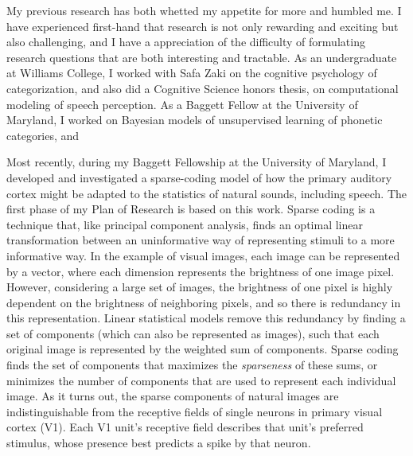 \documentclass[12pt]{article}
\begin{document}
My previous research has both whetted my appetite for more and humbled me.  I have experienced first-hand that research is not only rewarding and exciting but also challenging, and I have a appreciation of the difficulty of formulating research questions that are both interesting and tractable.  As an undergraduate at Williams College, I worked with Safa Zaki on the cognitive psychology of categorization, and also did a Cognitive Science honors thesis, on computational modeling of speech perception.  As a Baggett Fellow at the University of Maryland, I worked on Bayesian models of unsupervised learning of phonetic categories, and  %

Most recently, during my Baggett Fellowship at the University of Maryland, I developed and investigated a sparse-coding model of how the primary auditory cortex might be adapted to the statistics of natural sounds, including speech.  The first phase of my Plan of Research is based on this work.  Sparse coding is a technique that, like principal component analysis, finds an optimal linear transformation between an uninformative way of representing stimuli to a more informative way.  In the example of visual images, each image can be represented by a vector, where each dimension represents the brightness of one image pixel.  However, considering a large set of images, the brightness of one pixel is highly dependent on the brightness of neighboring pixels, and so there is redundancy in this representation.  Linear statistical models remove this redundancy by finding a set of components (which can also be represented as images), such that each original image is represented by the weighted sum of components.  Sparse coding finds the set of components that maximizes the \emph{sparseness} of these sums, or minimizes the number of components that are used to represent each individual image.  As it turns out, the sparse components of natural images are indistinguishable from the receptive fields of single neurons in primary visual cortex (V1).  Each V1 unit's receptive field describes that unit's preferred stimulus, whose presence best predicts a spike by that neuron.
\end{document}
